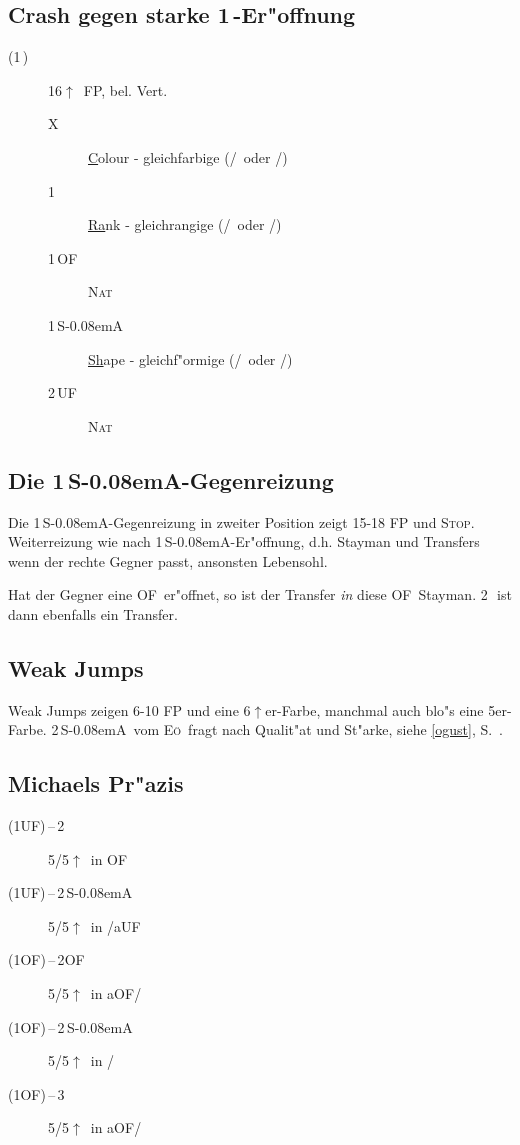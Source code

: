 \documentclass[11pt,german,twocolumn]{scrartcl}
\renewcommand{\Cl}{{\color{ClColor}{\clubs}}}
\renewcommand{\Di}{{\color{DiColor}{\sdiamonds}}}
\renewcommand{\He}{{\color{HeColor}{\shearts}}}
\renewcommand{\Sp}{{\color{SpColor}{\spades}}}
\def\kar{\,\Di}
\def\tre{\,\Cl}
\def\pi{\Sp}
\def\co{\He}
\def\ka{\Di}
\def\tr{\Cl}
\def\pl{$\uparrow$}
\def\uf{\textsf{\,UF}}
\def\of{\textsf{\,OF}}
\def\ufa{\textsf{UF}}
\def\aufa{\textsf{aUF}}
\def\ofa{\textsf{OF}}
\def\aofa{\textsf{aOF}}
\def\sa{\textsf{S\kern-0.08emA}}
\def\SA{\,\sa}
\def\kontra{\textsf{X}}
\def\sep{\,--\,}
\def\nat{\textsc{Nat}}
\def\stp{\textsc{Stop}}
\def\eo{\textsc{E\"o}}
\def\bdsc{\begin{description}}
\def\edsc{\end{description}}
\begin{document}
\subsection{Crash gegen starke 1\tre-Er"offnung}

\bdsc
\item[(1\tre)] 16\pl\ FP, bel. Vert.
\bdsc
\item[\kontra] \underline{C}olour - gleichfarbige (\tr/\pi\ oder \ka/\co)
\item[1\kar] \underline{Ra}nk - gleichrangige (\tr/\ka\ oder \co/\pi)
\item[1\of] \nat
\item[1\SA] \underline{Sh}ape - gleichf"ormige (\tr/\co\ oder \ka/\pi)
\item[2\uf] \nat
\edsc
\edsc

\subsection{Die 1\SA-Gegenreizung}

Die 1\SA-Gegenreizung in zweiter Position zeigt 15-18 FP und \stp. Weiterreizung wie nach
1\SA-Er"offnung, d.h. Stayman und Transfers wenn der rechte Gegner passt,
ansonsten Lebensohl.

Hat der Gegner eine \ofa\ er"offnet, so ist der Transfer \emph{in} diese \ofa\
Stayman. 2\tre\ ist dann ebenfalls ein Transfer.

\subsection{Weak Jumps}

Weak Jumps zeigen 6-10 FP und eine 6\pl{}er-Farbe, manchmal auch blo"s eine
5er-Farbe. 2\SA\ vom \eo\ fragt nach Qualit"at und St"arke, siehe \ref{ogust},
S.~\pageref{ogust}.

\subsection{Michaels Pr"azis}

\bdsc
\item[(1\ufa)\sep2\ka] 5/5\pl\ in \ofa
\item[(1\ufa)\sep2\SA] 5/5\pl\ in \co/\aufa
\item[(1\ofa)\sep2\ofa] 5/5\pl\ in \aofa/\tr
\item[(1\ofa)\sep2\SA] 5/5\pl\ in \tr/\ka
\item[(1\ofa)\sep3\tre] 5/5\pl\ in \aofa/\ka
\edsc
\end{document}

